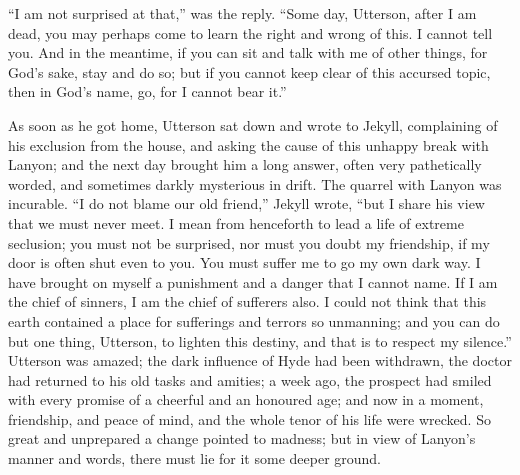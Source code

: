 \documentclass[12pt,openright]{book}
\begin{document}
“I am not surprised at that,” was the reply. “Some day, Utterson, after I am dead, you may perhaps come to learn the right and wrong of this. I cannot tell you. And in the meantime, if you can sit and talk with me of other things, for God’s sake, stay and do so; but if you cannot keep clear of this accursed topic, then in God’s name, go, for I cannot bear it.”

As soon as he got home, Utterson sat down and wrote to Jekyll, complaining of his exclusion from the house, and asking the cause of this unhappy break with Lanyon; and the next day brought him a long answer, often very pathetically worded, and sometimes darkly mysterious in drift. The quarrel with Lanyon was incurable. “I do not blame our old friend,” Jekyll wrote, “but I share his view that we must never meet. I mean from henceforth to lead a life of extreme seclusion; you must not be surprised, nor must you doubt my friendship, if my door is often shut even to you. You must suffer me to go my own dark way. I have brought on myself a punishment and a danger that I cannot name. If I am the chief of sinners, I am the chief of sufferers also. I could not think that this earth contained a place for sufferings and terrors so unmanning; and you can do but one thing, Utterson, to lighten this destiny, and that is to respect my silence.” Utterson was amazed; the dark influence of Hyde had been withdrawn, the doctor had returned to his old tasks and amities; a week ago, the prospect had smiled with every promise of a cheerful and an honoured age; and now in a moment, friendship, and peace of mind, and the whole tenor of his life were wrecked. So great and unprepared a change pointed to madness; but in view of Lanyon’s manner and words, there must lie for it some deeper ground.
\end{document}
